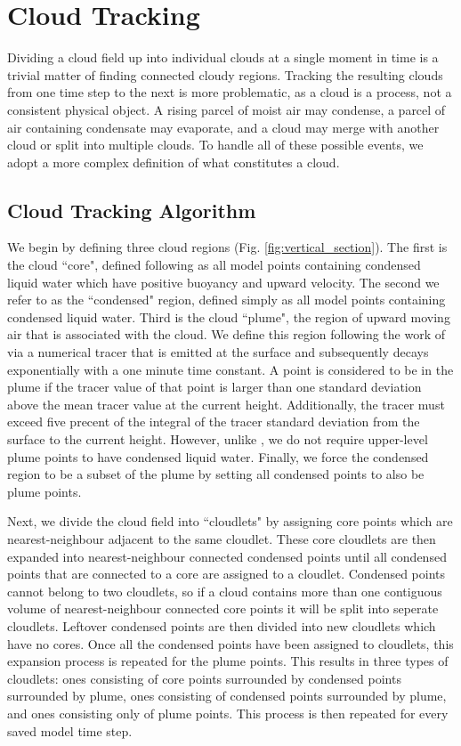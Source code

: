 \documentclass[acp]{copernicus}
\begin{document}
\section{Cloud Tracking}

Dividing a cloud field up into individual clouds at a single moment in time is 
a trivial matter of finding connected cloudy regions.  Tracking the resulting 
clouds from one time step to the next is more problematic, as a cloud is a 
process, not a consistent physical object.  A rising parcel of moist air may 
condense, a parcel of air containing condensate may evaporate, and a cloud 
may merge with another cloud or split into multiple clouds.  To handle all of 
these possible events, we adopt a more complex definition of what constitutes 
a cloud.

\subsection{Cloud Tracking Algorithm}

We begin by defining three cloud regions (Fig. \ref{fig:vertical_section}).  
The first is the cloud ``core", defined following \cite{Siebesma1995} as all 
model points containing condensed liquid water which have positive buoyancy and 
upward velocity.  The second we refer to as the ``condensed" region, defined 
simply as all model points containing condensed liquid water.  Third is the 
cloud ``plume", the region of upward moving air that is associated with the 
cloud.  We define this region following the work of \cite{Couvreaux2010} via a 
numerical tracer that is emitted at the surface and subsequently decays 
exponentially with a one minute time constant.  A point is considered to be in 
the plume if the tracer value of that point is larger than one standard 
deviation above the mean tracer value at the current height.  Additionally, 
the tracer must exceed five precent of the integral of the tracer standard 
deviation from the surface to the current height.  However, unlike 
\citeauthor{Couvreaux2010}, we do not require upper-level plume points to have 
condensed liquid water.  Finally, we force the condensed region to be a subset 
of the plume by setting all condensed points to also be plume points.

Next, we divide the cloud field into ``cloudlets" by assigning core points 
which are nearest-neighbour adjacent to the same cloudlet.  These core 
cloudlets are then expanded into nearest-neighbour connected condensed points 
until all condensed points that are connected to a core are assigned to a 
cloudlet.  Condensed points cannot belong to two cloudlets, so if a cloud 
contains more than one contiguous volume of nearest-neighbour connected core 
points it will be split into seperate cloudlets.  Leftover condensed points are 
then divided into new cloudlets which have no cores.  Once all the condensed 
points have been assigned to cloudlets, this expansion process is repeated for 
the plume points.  This results in three types of cloudlets: ones consisting of 
core points surrounded by condensed points surrounded by plume, ones consisting 
of condensed points surrounded by plume, and ones consisting only of plume 
points.  This process is then repeated for every saved model time step.
\end{document}
